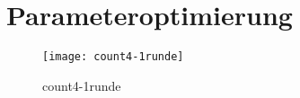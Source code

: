 \section{Parameteroptimierung}

\begin{figure}
	\centering
	\texttt{[image: count4-1runde]}
	\caption{count4-1runde}
	\label{fig:count4-1runde}
\end{figure}
